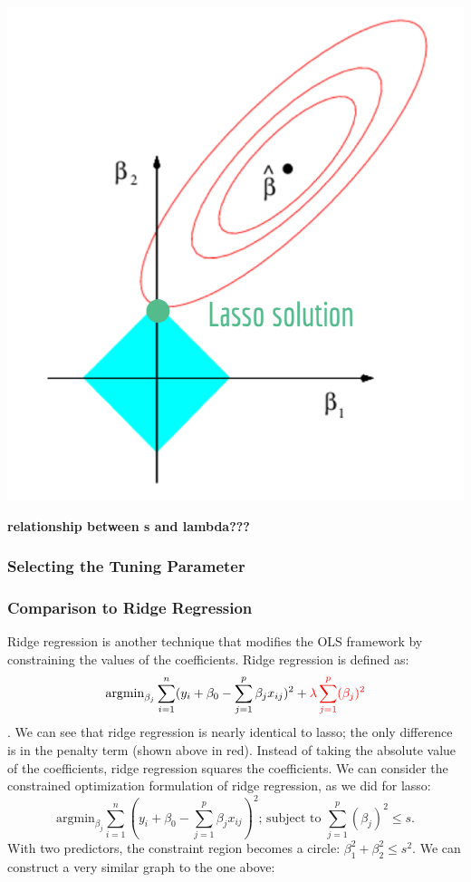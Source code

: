\documentclass[
]{article}
\begin{document}
\includegraphics{lasso_vis.png}

\textbf{relationship between s and lambda???}

\hypertarget{selecting-the-tuning-parameter}{%
\subsubsection{Selecting the Tuning
Parameter}\label{selecting-the-tuning-parameter}}

\hypertarget{comparison-to-ridge-regression}{%
\subsubsection{Comparison to Ridge
Regression}\label{comparison-to-ridge-regression}}

Ridge regression is another technique that modifies the OLS framework by
constraining the values of the coefficients. Ridge regression is defined
as:
\[\text{argmin}_{\beta_j}\sum_{i=1}^n ( y_i +\beta_0 - \sum_{j=1}^p \beta_jx_{ij} )^2 + \color{red}{\lambda \sum_{j=1}^p (\beta_j)^2}\].
We can see that ridge regression is nearly identical to lasso; the only
difference is in the penalty term (shown above in red). Instead of
taking the absolute value of the coefficients, ridge regression squares
the coefficients. We can consider the constrained optimization
formulation of ridge regression, as we did for lasso: \[
\text{argmin}_{\beta_j}\sum_{i=1}^n ( y_i +\beta_0 - \sum_{j=1}^p \beta_jx_{ij} )^2  \text{; subject to }  \sum_{j=1}^p (\beta_j)^2 \le s.
\] With two predictors, the constraint region becomes a circle:
\(\beta_1^2 + \beta_2^2 \le s^2\). We can construct a very similar graph
to the one above:
\end{document}
